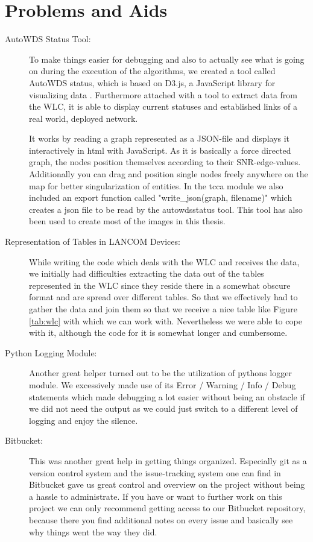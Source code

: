   \section{Problems and Aids}
    \begin{description}
    \item [AutoWDS Status Tool:]
      To make things easier for debugging and also to actually see what is going on during the execution of the algorithms,
      we created a tool called AutoWDS status, which is based on D3.js, a JavaScript library for visualizing data \cite{d3js}.
      Furthermore attached with a tool to extract data from the \ac{WLC}, it is able to display current statuses and established links of a real world, deployed network.
      
      It works by reading a graph represented as a \ac{JSON}-file and displays it interactively in html with JavaScript.
      As it is basically a force directed graph, the nodes position themselves according to their \ac{SNR}-edge-values. 
      Additionally you can drag and position single nodes freely anywhere on the map for better singularization of entities.
      In the tcca module we also included an export function called "write\_json(graph, filename)" which creates a json file to be read by the autowdsstatus tool.
      This tool has also been used to create most of the images in this thesis.

    \item [Representation of Tables in LANCOM Devices:]
      While writing the code which deals with the \ac{WLC} and receives the data, 
      we initially had difficulties extracting the data out of the tables represented in the \ac{WLC} since
      they reside there in a somewhat obscure format and are spread over different tables. So that we effectively had to gather the data and join them so that we receive a
      nice table like Figure \ref{tab:wlc} with which we can work with. 
      Nevertheless we were able to cope with it, although the code for it is somewhat longer and cumbersome.

    \item [Python Logging Module:]
      Another great helper turned out to be the utilization of pythons logger module. 
      We excessively made use of its Error / Warning / Info / Debug statements which made debugging
      a lot easier without being an obstacle if we did not need the output as we could just switch to a different level of logging and enjoy the silence.
    
    \item [Bitbucket:]
      This was another great help in getting things organized. Especially git \cite{git} 
      as a version control system and the issue-tracking system one can find in Bitbucket \cite{bitbucket}
      gave us great control and overview on the project without being a hassle to administrate. 
      If you have or want to further work on this project we can only recommend
      getting access to our Bitbucket repository, because there you find additional notes on every issue and basically see why things went the way they did.
      

\end{description}
